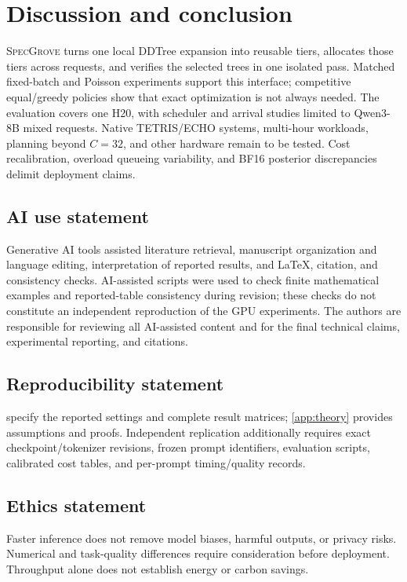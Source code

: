 \documentclass{article}
\newcommand{\method}{\textsc{SpecGrove}\xspace}
\begin{document}
\section{Discussion and conclusion}
\label{sec:discussion}
\method turns one local DDTree expansion into reusable tiers, allocates those tiers across requests, and verifies the selected trees in one isolated pass. Matched fixed-batch and Poisson experiments support this interface; competitive equal/greedy policies show that exact optimization is not always needed. The evaluation covers one H20, with scheduler and arrival studies limited to Qwen3-8B mixed requests. Native TETRIS/ECHO systems, multi-hour workloads, planning beyond $C=32$, and other hardware remain to be tested. Cost recalibration, overload queueing variability, and BF16 posterior discrepancies delimit deployment claims.

\label{end:main}
\clearpage



\subsection*{AI use statement}
Generative AI tools assisted literature retrieval, manuscript organization and language editing, interpretation of reported results, and LaTeX, citation, and consistency checks. AI-assisted scripts were used to check finite mathematical examples and reported-table consistency during revision; these checks do not constitute an independent reproduction of the GPU experiments. The authors are responsible for reviewing all AI-assisted content and for the final technical claims, experimental reporting, and citations.

\subsection*{Reproducibility statement}
 specify the reported settings and complete result matrices; \cref{app:theory} provides assumptions and proofs. Independent replication additionally requires exact checkpoint/tokenizer revisions, frozen prompt identifiers, evaluation scripts, calibrated cost tables, and per-prompt timing/quality records.

\subsection*{Ethics statement}
Faster inference does not remove model biases, harmful outputs, or privacy risks. Numerical and task-quality differences require consideration before deployment. Throughput alone does not establish energy or carbon savings.
\end{document}
